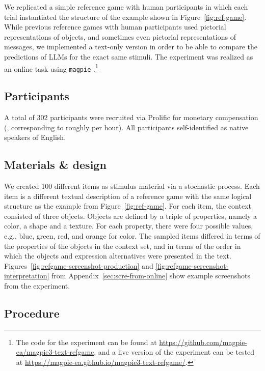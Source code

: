 \documentclass[fleqn]{article}
\begin{document}
We replicated a simple reference game with human participants in which each trial instantiated the structure of the example shown in Figure~\ref{fig:ref-game}.
While previous reference games with human participants used pictorial representations of objects, and sometimes even pictorial representations of messages, we implemented a text-only version in order to be able to compare the predictions of LLMs for the exact same stimuli.
The experiment was realized as an online task using \texttt{magpie} \citep{FrankeJi:magpie:-Minimal}.\footnote{
  The code for the experiment can be found at \href{https://github.com/magpie-ea/magpie3-text-refgame}{https://github.com/magpie-ea/magpie3-text-refgame}, and a live version of the experiment can be tested at \href{https://magpie-ea.github.io/magpie3-text-refgame/}{https://magpie-ea.github.io/magpie3-text-refgame/}.
}


\subsection{Participants}
\label{participants}

A total of 302 participants were recruited via Prolific for monetary
compensation (, corresponding to roughly  per hour).
All participants self-identified as native speakers of English.

\subsection{Materials \& design}
\label{materials-design}

We created 100 different items as stimulus material via a stochastic process.
Each item is a different textual description of a reference game with the same logical structure as the example from Figure~\ref{fig:ref-game}.
For each item, the context consisted of three objects.
Objects are defined by a triple of properties, namely a color, a shape and a texture.
For each property, there were four possible values, e.g., blue, green, red, and orange for color.
The sampled items differed in terms of the properties of the objects in the context set, and in terms of the order in which the objects and expression alternatives were presented in the text.
Figures~\ref{fig:refgame-screenshot-production} and \ref{fig:refgame-screenshot-interpretation} from Appendix~\ref{sec:scre-from-online} show example screenshots from the experiment.

\subsection{Procedure}
\label{procedure}
\end{document}
